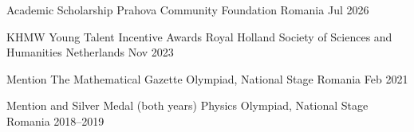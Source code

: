 
\begin{cvhonors}
  \cvhonor
  {Academic Scholarship} %
  {Prahova Community Foundation} %
  {Romania} %
  {Jul 2026} %

  \cvhonor
  {KHMW Young Talent Incentive Awards} %
  {Royal Holland Society of Sciences and Humanities} %
  {Netherlands} %
  {Nov 2023} %

  \cvhonor
  {Mention} %
  {The Mathematical Gazette Olympiad, National Stage} %
  {Romania} %
  {Feb 2021} %

  \cvhonor
  {Mention and Silver Medal (both years)} %
  {Physics Olympiad, National Stage} %
  {Romania} %
  {2018--2019} %
\end{cvhonors}
